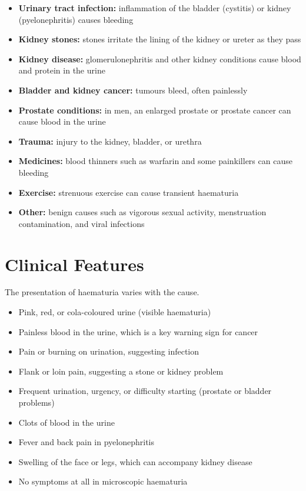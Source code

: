 \begin{itemize}
    \item \textbf{Urinary tract infection:} inflammation of the bladder (cystitis) or kidney (pyelonephritis) causes bleeding
    \item \textbf{Kidney stones:} stones irritate the lining of the kidney or ureter as they pass
    \item \textbf{Kidney disease:} glomerulonephritis and other kidney conditions cause blood and protein in the urine
    \item \textbf{Bladder and kidney cancer:} tumours bleed, often painlessly
    \item \textbf{Prostate conditions:} in men, an enlarged prostate or prostate cancer can cause blood in the urine
    \item \textbf{Trauma:} injury to the kidney, bladder, or urethra
    \item \textbf{Medicines:} blood thinners such as warfarin and some painkillers can cause bleeding
    \item \textbf{Exercise:} strenuous exercise can cause transient haematuria
    \item \textbf{Other:} benign causes such as vigorous sexual activity, menstruation contamination, and viral infections
\end{itemize}

\section*{Clinical Features}
The presentation of haematuria varies with the cause.

\begin{itemize}
    \item Pink, red, or cola-coloured urine (visible haematuria)
    \item Painless blood in the urine, which is a key warning sign for cancer
    \item Pain or burning on urination, suggesting infection
    \item Flank or loin pain, suggesting a stone or kidney problem
    \item Frequent urination, urgency, or difficulty starting (prostate or bladder problems)
    \item Clots of blood in the urine
    \item Fever and back pain in pyelonephritis
    \item Swelling of the face or legs, which can accompany kidney disease
    \item No symptoms at all in microscopic haematuria
\end{itemize}


